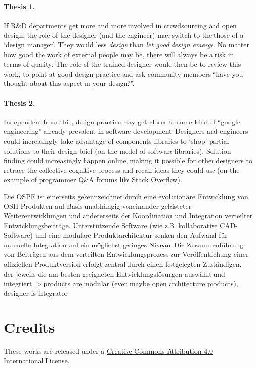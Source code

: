 \documentclass{article}
\begin{document}
\paragraph{Thesis 1.}If R\&D departments get more and more involved in crowdsourcing and open design, the role of the designer (and the engineer) may switch to the those of a `design manager'. They would less \emph{design} than \emph{let good design emerge}. No matter how good the work of external people may be, there will always be a risk in terms of quality. The role of the trained designer would then be to review this work, to point at good design practice and ask community members ``have you thought about this aspect in your design?''.

\paragraph{Thesis 2.}Independent from this, design practice may get closer to some kind of ``google engineering'' already prevalent in software development. Designers and engineers could increasingly take advantage of components libraries to `shop' partial solutions to their design brief (on the model of software libraries). Solution finding could increasingly happen online, making it possible for other designers to retrace the collective cognitive process and recall ideas they could use (on the example of programmer Q\&A forums like \href{https://en.wikipedia.org/wiki/Stack_Overflow}{Stack Overflow}).

{\color{red}Die OSPE ist einerseits gekennzeichnet durch eine evolutionäre Entwicklung von OSH-Produkten auf Basis unabhängig voneinander geleisteter Weiterentwicklungen und andererseits der Koordination und Integration verteilter Entwicklungsbeiträge. Unterstützende Software (wie z.B. kollaborative CAD-Software) und eine modulare Produktarchitektur senken den Aufwand für manuelle Integration auf ein möglichst geringes Niveau. Die Zusammenführung von Beiträgen aus dem verteilten Entwicklungsprozess zur Veröffentlichung einer offiziellen Produktversion erfolgt zentral durch einen festgelegten Zuständigen, der jeweils die am besten geeigneten Entwicklungslösungen auswählt und integriert. > products are modular (even maybe open architecture products), designer is integrator}

\section*{Credits}
\label{sec:credits}
These works are released under a \href{https://creativecommons.org/licenses/by/4.0/}{Creative Commons Attribution 4.0 International License}. 
\end{document}
